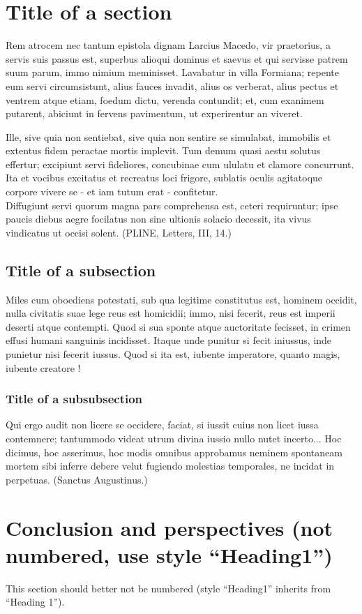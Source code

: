 \documentclass[10pt,a5paper,twoside]{article}
\begin{document}
\section{Title of a section}
Rem atrocem nec tantum epistola dignam Larcius Macedo, vir praetorius, a servis suis passus est, superbus alioqui dominus et saevus et qui servisse patrem suum parum, immo nimium meminisset. Lavabatur in villa Formiana; repente eum servi circumsistunt, alius fauces invadit, alius os verberat, alius pectus et ventrem atque etiam, foedum dictu, verenda contundit; et, cum exanimem putarent, abiciunt in fervens pavimentum, ut experirentur an viveret. 

Ille, sive quia non sentiebat, sive quia non sentire se simulabat, immobilis et extentus fidem peractae mortis implevit. Tum demum quasi aestu solutus effertur; excipiunt servi fideliores, concubinae cum ululatu et clamore concurrunt. Ita et vocibus excitatus et recreatus loci frigore, sublatis oculis agitatoque corpore vivere se - et iam tutum erat - confitetur. \\
\newpage
Diffugiunt servi quorum magna pars comprehensa est, ceteri requiruntur; ipse paucis diebus aegre focilatus non sine ultionis solacio decessit, ita vivus vindicatus ut occisi solent. (PLINE, Letters, III, 14.)
\subsection{Title of a subsection}
Miles cum oboediens potestati, sub qua legitime constitutus est, hominem occidit, nulla civitatis suae lege reus est homicidii; immo, nisi fecerit, reus est imperii deserti atque contempti. Quod si sua sponte atque auctoritate fecisset, in crimen effusi humani sanguinis incidisset. Itaque unde punitur si fecit iniussus, inde punietur nisi fecerit iussus. Quod si ita est, iubente imperatore, quanto magis, iubente creatore ! 
\subsubsection{Title of a subsubsection}
Qui ergo audit non licere se occidere, faciat, si iussit cuius non licet iussa contemnere; tantummodo videat utrum divina iussio nullo nutet incerto... Hoc dicimus, hoc asserimus, hoc modis omnibus approbamus neminem spontaneam mortem sibi inferre debere velut fugiendo molestias temporales, ne incidat in perpetuas. (Sanctus Augustinus.)

\section*{Conclusion and perspectives (not numbered, use style “Heading1”)} %
This section should better not be numbered (style “Heading1” inherits from “Heading 1”).
\end{document}
